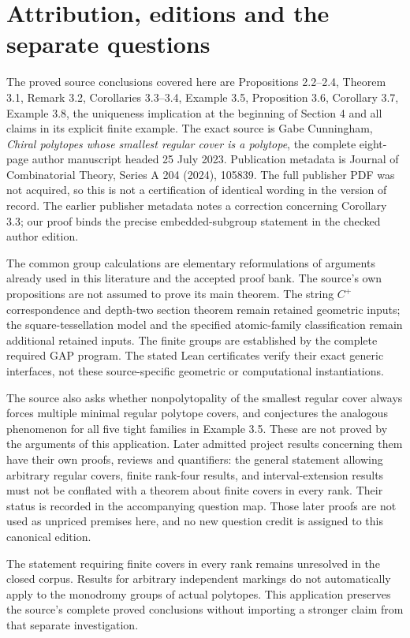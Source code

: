 \section{Attribution, editions and the separate questions}
The proved source conclusions covered here are Propositions 2.2--2.4, Theorem 3.1, Remark 3.2, Corollaries 3.3--3.4, Example 3.5, Proposition 3.6, Corollary 3.7, Example 3.8, the uniqueness implication at the beginning of Section 4 and all claims in its explicit finite example. The exact source is Gabe Cunningham, \emph{Chiral polytopes whose smallest regular cover is a polytope}, the complete eight-page author manuscript headed 25 July 2023. Publication metadata is Journal of Combinatorial Theory, Series A 204 (2024), 105839. The full publisher PDF was not acquired, so this is not a certification of identical wording in the version of record. The earlier publisher metadata notes a correction concerning Corollary 3.3; our proof binds the precise embedded-subgroup statement in the checked author edition.

The common group calculations are elementary reformulations of arguments already used in this literature and the accepted proof bank. The source's own propositions are not assumed to prove its main theorem. The string $C^+$ correspondence and depth-two section theorem remain retained geometric inputs; the square-tessellation model and the specified atomic-family classification remain additional retained inputs. The finite groups are established by the complete required GAP program. The stated Lean certificates verify their exact generic interfaces, not these source-specific geometric or computational instantiations.

The source also asks whether nonpolytopality of the smallest regular cover always forces multiple minimal regular polytope covers, and conjectures the analogous phenomenon for all five tight families in Example 3.5. These are not proved by the arguments of this application. Later admitted project results concerning them have their own proofs, reviews and quantifiers: the general statement allowing arbitrary regular covers, finite rank-four results, and interval-extension results must not be conflated with a theorem about finite covers in every rank. Their status is recorded in the accompanying question map. Those later proofs are not used as unpriced premises here, and no new question credit is assigned to this canonical edition.

The statement requiring finite covers in every rank remains unresolved in the closed corpus. Results for arbitrary independent markings do not automatically apply to the monodromy groups of actual polytopes. This application preserves the source's complete proved conclusions without importing a stronger claim from that separate investigation.
